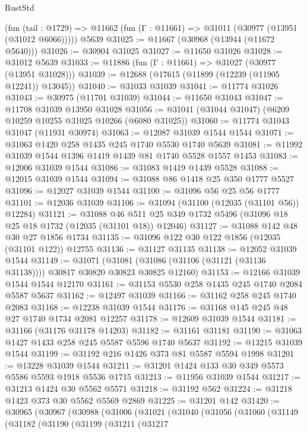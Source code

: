 \begin{lexlean}{RustStd}
\begin{coremodule}
    (fun (tail : @1729) => @11662 (fun (Γ : @11661) => @31011 (@30977 (@13951 (@31012 @6066)))))
    @5639
@31025 := @11667 (@30968 (@13944 (@11672 @5640)))
@31026 := @30904 @31025
@31027 := @11650 @31026
@31028 := @31012 @5639
@31033 := @11886 (fun (Γ : @11661) => @31027 (@30977 (@13951 @31028)))
@31039 := @12688 (@17615 (@11899 (@12239 (@11905 @12241)) @13045))
@31040 := @31033 @31039
@31041 := @11774 @31026
@31043 := @30975 (@11701 @31039)
@31044 := @11650 @31043
@31047 := @11708 @31039 @13950 @31028
@31056 := @31041 (@31044 @31047) (@6209 @10259 @10255 @31025 @10266 (@6080 @31025))
@31060 := @11774 @31043 @31047 (@11931 @30974)
@31063 := @12087 @31039 @1544 @1544
@31071 := @31063 @1420 @258 @1435 @245 @1740 @5530 @1740 @5639
@31081 := @11992 @31039 @1544 @1396 @1419 @1439 @81 @1740 @5528 @1557 @1453
@31083 := @12006 @31039 @1544
@31086 := @31083 @1419 @1439 @5528
@31088 := @12015 @31039 @1544
@31094 := @31088 @86 @1418 @25 @350 @1777 @5527
@31096 := @12027 @31039 @1544
@31100 := @31096 @56 @25 @56 @1777
@31101 := @12036 @31039
@31106 := @31094 (@31100 (@12035 (@31101 @56)) @12284)
@31121 := @31088
    @46
    @511
    @25
    @349
    @1732
    @5496
    (@31096 @18 @25 @18 @1732 (@12035 (@31101 @18)) @12046)
@31127 := @31088 @142 @48 @30 @27 @1856 @1734
@31135 := @31096 @122 @30 @122 @1856 (@12035 (@31101 @122)) @12755
@31136 := @31127 @31135
@31138 := @12052 @31039 @1544
@31149 := @31071
    (@31081 (@31086 (@31106 (@31121 (@31136 @31138)))) @30817 @30820 @30823 @30825 @12160)
@31153 := @12166 @31039 @1544 @1544 @12170
@31161 := @31153 @5530 @258 @1435 @245 @1740 @2084 @5587 @5637
@31162 := @12497 @31039
@31166 := @31162 @258 @245 @1740 @2083
@31168 := @12238 @31039 @1544
@31176 := @31168 @145 @245 @48 @27 @1740 @1734 @2081 @12257
@31178 := @12609 @31039 @1544
@31181 := @31166 (@31176 @31178 @14203)
@31182 := @31161 @31181
@31190 := @31063 @1427 @1433 @258 @245 @5587 @5596 @1740 @5637
@31192 := @13215 @31039 @1544
@31199 := @31192 @216 @1426 @373 @81 @5587 @5594 @1998
@31201 := @13228 @31039 @1544
@31211 := @31201 @1424 @133 @30 @349 @5573 @5586 @5593 @1918 @5536 @1715
@31213 := @11956 @31039 @1544
@31217 := @31213 @1424 @30 @5562 @5571
@31218 := @31192 @562
@31224 := @31218 @1423 @373 @30 @5562 @5569 @2869
@31225 := @31201 @142
@31420 := @30965
    (@30967
      (@30988
        (@31006
          (@31021
            (@31040
              (@31056
                (@31060
                  (@31149
                    (@31182
                      (@31190
                        (@31199
                          (@31211
                            (@31217

\end{coremodule}
\end{lexlean}
